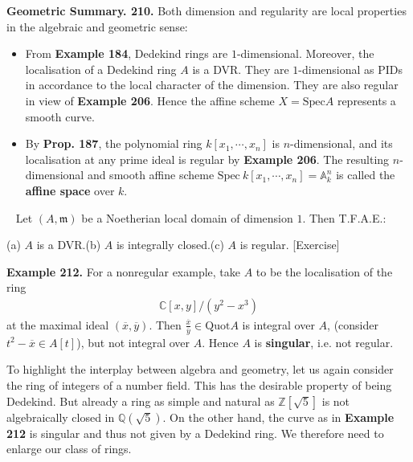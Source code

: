 \documentclass[12pt,a4paper,footinclude=true,headinclude=true]{scrbook} %
\newenvironment{proposition}[2][]
{\renewcommand\theinnercustomprop{#2}\innercustomprop[#1] 
\begin{mdframed}[backgroundcolor=gray!20]\ }
{\end{mdframed}\endinnercustomprop}
\newenvironment{example}[2][Example]
    { \begin{mdframed}[backgroundcolor=gray!20] \textbf{#1 #2.} }
    {  \end{mdframed}}
\newenvironment{summary}[2][]
    { \begin{mdframed}[backgroundcolor=gray!20] \textbf{#1 #2.} }
    {  \end{mdframed}}
\begin{document}
\begin{summary}{Geometric Summary. 210}
    Both dimension and regularity are local properties in the algebraic and geometric sense:
    \begin{itemize}
        \item From \textbf{Example 184}, Dedekind rings are $1$-dimensional. Moreover, the localisation of a Dedekind ring $A$ is a DVR. They are $1$-dimensional as PIDs in accordance to the local character of the dimension. They are also regular in view of \textbf{Example 206}. Hence the affine scheme $X=\mathrm{Spec}A$ represents a smooth curve.
        \item By \textbf{Prop. 187}, the polynomial ring $k[x_1,\cdots,x_n]$ is $n$-dimensional, and its localisation at any prime ideal is regular by \textbf{Example 206}. The resulting $n$-dimensional and smooth affine scheme $\mathrm{Spec}\ k[x_1,\cdots,x_n]=\mathbb{A}_k^n$ is called the \textbf{affine space} over $k$.
    \end{itemize}
\end{summary}

\begin{proposition}{211}
    Let $(A,\mathfrak{m})$ be a Noetherian local domain of dimension $1$. Then T.F.A.E.:\\ \centerline{(a) $A$ is a DVR.\qquad (b) $A$ is integrally closed.\qquad (c) $A$ is regular. [Exercise]}
\end{proposition}

\begin{example}{212}
    For a nonregular example, take $A$ to be the localisation of the ring
    \begin{align*}
        \mathbb{C}[x,y]/(y^2-x^3)
    \end{align*}
    at the maximal ideal $(\overline{x},\overline{y})$. Then $\frac{\overline{x}}{\overline{y}}\in\mathrm{Quot}A$ is integral over $A$, (consider $t^2-\overline{x}\in A[t]$), but not integral over $A$. Hence $A$ is \textbf{singular}, i.e. not regular.
\end{example}
\newpage
To highlight the interplay between algebra and geometry, let us again consider the ring of integers of a number field. This has the desirable property of being Dedekind. But already a ring as simple and natural as $\mathbb{Z}[\sqrt{5}]$ is not algebraically closed in $\mathbb{Q}(\sqrt{5})$. On the other hand, the curve as in \textbf{Example 212} is singular and thus not given by a Dedekind ring. We therefore need to enlarge our class of rings.
\end{document}
